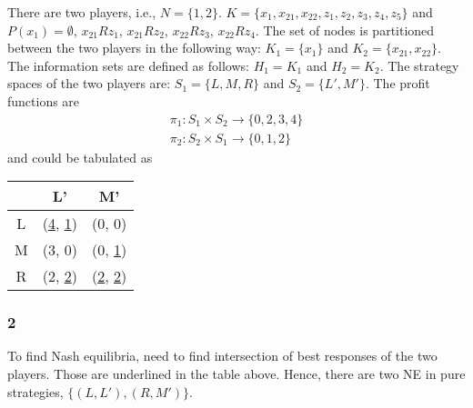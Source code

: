 \documentclass[]{article}
\begin{document}
There are two players, i.e., $N = \{1, 2\}$. $K = \{x_1, x_{21},x_{22}, z_1, z_2, z_3, z_4, z_5\}$ and $P(x_1) = \emptyset$, $x_{21}Rz_1$, $x_{21}Rz_2$, $x_{22}Rz_3$, $x_{22}Rz_4$. The set of nodes is partitioned between the two players in the following way: $K_1 = \{x_1\}$ and $K_2 = \{x_{21}, x_{22}\}$. The information sets are defined as follows: $H_1 = K_1$ and $H_2 = K_2$.
The strategy spaces of the two players are: $S_1 = \{L, M, R\}$ and $S_2 = \{L', M'\}$. The profit functions are
\begin{equation}
	\begin{split}
		\pi_1: S_1\times S_2 \to \{0, 2, 3, 4\} \\ \nonumber
		\pi_2: S_2\times S_1 \to \{0, 1, 2\}
	\end{split}
\end{equation}
and could be tabulated as
\begin{table}[h]
	\centering
	\begin{tabular}{c|cc}
		 & L' & M' \\ \hline
		L & (\ul{4}, \ul{1}) & (0, 0) \\
		M & (3, 0) & (0, \ul{1}) \\
		R & (2, \ul{2}) & (\ul{2}, \ul{2})
	\end{tabular}
\end{table}

\subsubsection*{2}

To find Nash equilibria, need to find intersection of best responses of the two players. Those are underlined in the table above. Hence, there are two NE in pure strategies, $\{(L, L'), (R, M')\}$.
\end{document}
